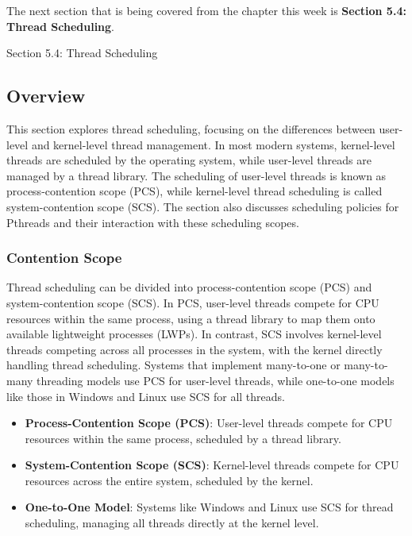 The next section that is being covered from the chapter this week is \textbf{Section 5.4: Thread Scheduling}.

\begin{notes}{Section 5.4: Thread Scheduling}
    \subsection*{Overview}

    This section explores thread scheduling, focusing on the differences between user-level and kernel-level thread management. In most modern systems, kernel-level threads are scheduled by the operating 
    system, while user-level threads are managed by a thread library. The scheduling of user-level threads is known as process-contention scope (PCS), while kernel-level thread scheduling is called 
    system-contention scope (SCS). The section also discusses scheduling policies for Pthreads and their interaction with these scheduling scopes.
    
    \subsubsection*{Contention Scope}
    
    Thread scheduling can be divided into process-contention scope (PCS) and system-contention scope (SCS). In PCS, user-level threads compete for CPU resources within the same process, using a thread 
    library to map them onto available lightweight processes (LWPs). In contrast, SCS involves kernel-level threads competing across all processes in the system, with the kernel directly handling thread 
    scheduling. Systems that implement many-to-one or many-to-many threading models use PCS for user-level threads, while one-to-one models like those in Windows and Linux use SCS for all threads.
    
    \begin{highlight}
    
        \begin{itemize}
            \item \textbf{Process-Contention Scope (PCS)}: User-level threads compete for CPU resources within the same process, scheduled by a thread library.
            \item \textbf{System-Contention Scope (SCS)}: Kernel-level threads compete for CPU resources across the entire system, scheduled by the kernel.
            \item \textbf{One-to-One Model}: Systems like Windows and Linux use SCS for thread scheduling, managing all threads directly at the kernel level.
        \end{itemize}
    

\end{highlight}
\end{notes}
